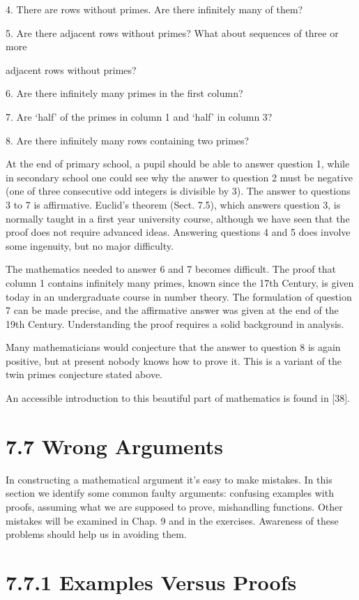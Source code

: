 \documentclass[11pt]{article}
\theoremstyle{plain}
\theoremstyle{definition}
\begin{document}
4. There are rows without primes. Are there infinitely many of them?

5. Are there adjacent rows without primes? What about sequences of three or more

adjacent rows without primes?

6. Are there infinitely many primes in the first column?

7. Are `half' of the primes in column 1 and `half' in column 3?

8. Are there infinitely many rows containing two primes?

At the end of primary school, a pupil should be able to answer question 1, while in secondary school one could see why the answer to question 2 must be negative (one of three consecutive odd integers is divisible by 3). The answer to questions 3 to 7 is affirmative. Euclid's theorem (Sect. 7.5), which answers question 3, is normally taught in a first year university course, although we have seen that the proof does not require advanced ideas. Answering questions 4 and 5 does involve some ingenuity, but no major difficulty.

The mathematics needed to answer 6 and 7 becomes difficult. The proof that column 1 contains infinitely many primes, known since the 17th Century, is given today in an undergraduate course in number theory. The formulation of question 7 can be made precise, and the affirmative answer was given at the end of the 19th Century. Understanding the proof requires a solid background in analysis.

Many mathematicians would conjecture that the answer to question 8 is again positive, but at present nobody knows how to prove it. This is a variant of the twin primes conjecture stated above.

An accessible introduction to this beautiful part of mathematics is found in [38].

\section{7.7 Wrong Arguments}

In constructing a mathematical argument it's easy to make mistakes. In this section we identify some common faulty arguments: confusing examples with proofs, assuming what we are supposed to prove, mishandling functions. Other mistakes will be examined in Chap. 9 and in the exercises. Awareness of these problems should help us in avoiding them.

\section{7.7.1 Examples Versus Proofs}
\end{document}
